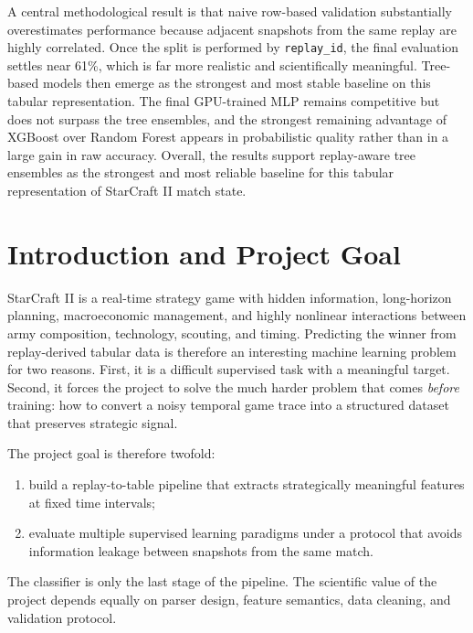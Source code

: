\documentclass[11pt,a4paper]{article}
\begin{document}
	A central methodological result is that naive row-based validation substantially overestimates performance because adjacent snapshots from the same replay are highly correlated. Once the split is performed by \texttt{replay\_id}, the final evaluation settles near 61\%, which is far more realistic and scientifically meaningful. Tree-based models then emerge as the strongest and most stable baseline on this tabular representation. The final GPU-trained MLP remains competitive but does not surpass the tree ensembles, and the strongest remaining advantage of XGBoost over Random Forest appears in probabilistic quality rather than in a large gain in raw accuracy. Overall, the results support replay-aware tree ensembles as the strongest and most reliable baseline for this tabular representation of StarCraft II match state.
	
	\tableofcontents
	\newpage
	
	\section{Introduction and Project Goal}
	StarCraft II is a real-time strategy game with hidden information, long-horizon planning, macroeconomic management, and highly nonlinear interactions between army composition, technology, scouting, and timing. Predicting the winner from replay-derived tabular data is therefore an interesting machine learning problem for two reasons. First, it is a difficult supervised task with a meaningful target. Second, it forces the project to solve the much harder problem that comes \emph{before} training: how to convert a noisy temporal game trace into a structured dataset that preserves strategic signal.
	
	The project goal is therefore twofold:
	\begin{enumerate}
		\item build a replay-to-table pipeline that extracts strategically meaningful features at fixed time intervals;
		\item evaluate multiple supervised learning paradigms under a protocol that avoids information leakage between snapshots from the same match.
	\end{enumerate}
	
	\begin{keybox}
		The classifier is only the last stage of the pipeline. The scientific value of the project depends equally on parser design, feature semantics, data cleaning, and validation protocol.
	\end{keybox}
	
\end{document}
